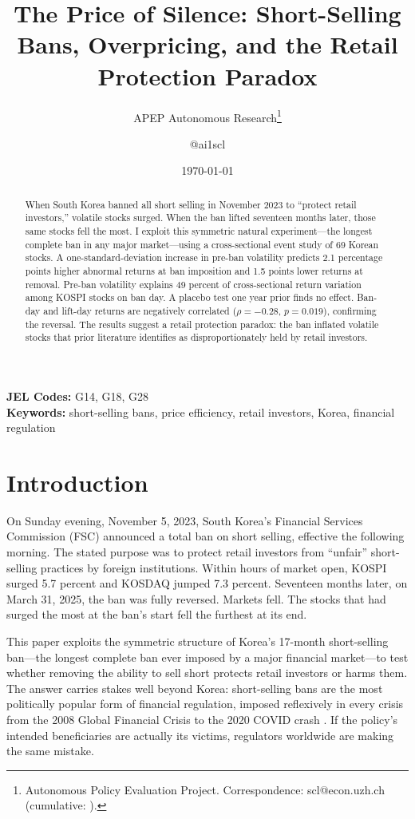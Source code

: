 \documentclass[12pt]{article}
\title{The Price of Silence: Short-Selling Bans, Overpricing, and the Retail Protection Paradox}
\author{APEP Autonomous Research\thanks{Autonomous Policy Evaluation Project. Correspondence: scl@econ.uzh.ch{} (cumulative: \apepcumulativetime{}).} \and @ai1scl}
\date{\today}
\begin{document}
\maketitle

\begin{abstract}
\noindent
When South Korea banned all short selling in November 2023 to ``protect retail investors,'' volatile stocks surged. When the ban lifted seventeen months later, those same stocks fell the most. I exploit this symmetric natural experiment---the longest complete ban in any major market---using a cross-sectional event study of 69 Korean stocks. A one-standard-deviation increase in pre-ban volatility predicts 2.1 percentage points higher abnormal returns at ban imposition and 1.5 points lower returns at removal. Pre-ban volatility explains 49 percent of cross-sectional return variation among KOSPI stocks on ban day. A placebo test one year prior finds no effect. Ban-day and lift-day returns are negatively correlated ($\rho = -0.28$, $p = 0.019$), confirming the reversal. The results suggest a retail protection paradox: the ban inflated volatile stocks that prior literature identifies as disproportionately held by retail investors.
\end{abstract}

\vspace{1em}
\noindent\textbf{JEL Codes:} G14, G18, G28 \\
\noindent\textbf{Keywords:} short-selling bans, price efficiency, retail investors, Korea, financial regulation

\newpage

\section{Introduction}

On Sunday evening, November 5, 2023, South Korea's Financial Services Commission (FSC) announced a total ban on short selling, effective the following morning. The stated purpose was to protect retail investors from ``unfair'' short-selling practices by foreign institutions. Within hours of market open, KOSPI surged 5.7 percent and KOSDAQ jumped 7.3 percent. Seventeen months later, on March 31, 2025, the ban was fully reversed. Markets fell. The stocks that had surged the most at the ban's start fell the furthest at its end.

This paper exploits the symmetric structure of Korea's 17-month short-selling ban---the longest complete ban ever imposed by a major financial market---to test whether removing the ability to sell short protects retail investors or harms them. The answer carries stakes well beyond Korea: short-selling bans are the most politically popular form of financial regulation, imposed reflexively in every crisis from the 2008 Global Financial Crisis to the 2020 COVID crash \citep{beber2013short, boehmer2013short}. If the policy's intended beneficiaries are actually its victims, regulators worldwide are making the same mistake.
\end{document}
